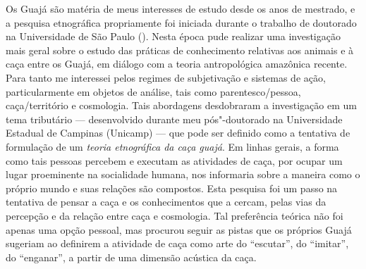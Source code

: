 Os Guajá são matéria de meus interesses de estudo desde os anos de
mestrado, e a pesquisa etnográfica propriamente foi iniciada durante o
trabalho de doutorado na Universidade de São Paulo (). Nesta época
pude realizar uma investigação mais geral sobre o estudo das práticas de
conhecimento relativas aos animais e à caça entre os Guajá, em diálogo
com a teoria antropológica amazônica recente. Para tanto me interessei
pelos regimes de subjetivação e sistemas de ação, particularmente em
objetos de análise, tais como parentesco/pessoa, caça/território e
cosmologia. Tais abordagens desdobraram a investigação em um tema
tributário --- desenvolvido durante meu pós"-doutorado na Universidade
Estadual de Campinas (Unicamp) --- que pode ser definido como a tentativa
de formulação de um \emph{teoria etnográfica da caça guajá}. Em linhas
gerais, a forma como tais pessoas percebem e executam as atividades de
caça, por ocupar um lugar proeminente na socialidade humana, nos
informaria sobre a maneira como o próprio mundo e suas relações são
compostos. Esta pesquisa foi um passo na tentativa de pensar a caça e os
conhecimentos que a cercam, pelas vias da percepção e da relação entre
caça e cosmologia. Tal preferência teórica não foi apenas uma opção
pessoal, mas procurou seguir as pistas que os próprios Guajá sugeriam ao
definirem a atividade de caça como arte do ``escutar'', do ``imitar'', do
``enganar'', a partir de uma dimensão acústica da caça.

